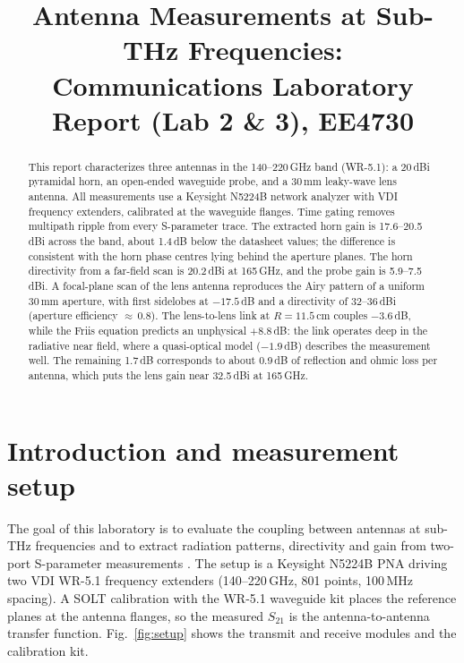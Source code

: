 \documentclass[conference]{IEEEtran}
\title{Antenna Measurements at Sub-THz Frequencies:\\
Communications Laboratory Report (Lab 2 \& 3), EE4730}
\author{\IEEEauthorblockN{Daniel Tyukov}
\IEEEauthorblockA{Student number 5714699 \\
Department of Microelectronics, TU Delft \\
d.a.tyukov@student.tudelft.nl \\
Measurement group G2}}
\begin{document}
\maketitle

\begin{abstract}
This report characterizes three antennas in the 140--220\,GHz band (WR-5.1): a 20\,dBi pyramidal horn, an open-ended waveguide probe, and a 30\,mm leaky-wave lens antenna. All measurements use a Keysight N5224B network analyzer with VDI frequency extenders, calibrated at the waveguide flanges. Time gating removes multipath ripple from every S-parameter trace. The extracted horn gain is 17.6--20.5\,dBi across the band, about 1.4\,dB below the datasheet values; the difference is consistent with the horn phase centres lying behind the aperture planes. The horn directivity from a far-field scan is 20.2\,dBi at 165\,GHz, and the probe gain is 5.9--7.5\,dBi. A focal-plane scan of the lens antenna reproduces the Airy pattern of a uniform 30\,mm aperture, with first sidelobes at $-17.5$\,dB and a directivity of 32--36\,dBi (aperture efficiency $\approx$\,0.8). The lens-to-lens link at $R=11.5$\,cm couples $-3.6$\,dB, while the Friis equation predicts an unphysical $+8.8$\,dB: the link operates deep in the radiative near field, where a quasi-optical model ($-1.9$\,dB) describes the measurement well. The remaining 1.7\,dB corresponds to about 0.9\,dB of reflection and ohmic loss per antenna, which puts the lens gain near 32.5\,dBi at 165\,GHz.
\end{abstract}

\section{Introduction and measurement setup}
The goal of this laboratory is to evaluate the coupling between antennas at sub-THz frequencies and to extract radiation patterns, directivity and gain from two-port S-parameter measurements \cite{lab1,lab2}. The setup is a Keysight N5224B PNA driving two VDI WR-5.1 frequency extenders (140--220\,GHz, 801 points, 100\,MHz spacing). A SOLT calibration with the WR-5.1 waveguide kit places the reference planes at the antenna flanges, so the measured $S_{21}$ is the antenna-to-antenna transfer function. Fig.~\ref{fig:setup} shows the transmit and receive modules and the calibration kit.
\end{document}
